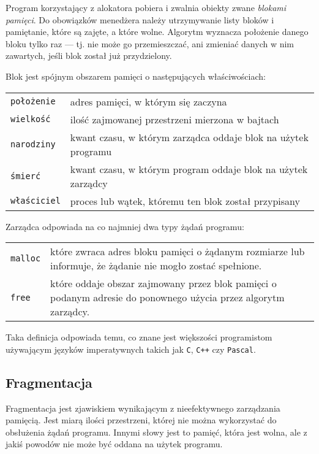 \documentclass[12pt,a4paper,titlepage,twoside]{mwart}
\begin{document}
Program korzystający z alokatora pobiera i zwalnia obiekty zwane
\textit{blokami pamięci}. Do obowiązków menedżera należy utrzymywanie listy
bloków i pamiętanie, które są zajęte, a które wolne. Algorytm wyznacza
położenie danego bloku tylko raz --- tj. nie może go przemieszczać, ani zmieniać
danych w nim zawartych, jeśli blok został już przydzielony.

Blok jest spójnym obszarem pamięci o następujących właściwościach:

\begin{tabularx}{\textwidth}{@{\hspace{4ex}}lX@{}}
	\texttt{położenie}	& adres pamięci, w którym się zaczyna \\
	\texttt{wielkość}	& ilość zajmowanej przestrzeni mierzona w bajtach \\
	\texttt{narodziny}	& kwant czasu, w którym zarządca oddaje blok na użytek programu \\
	\texttt{śmierć}		& kwant czasu, w którym program oddaje blok na użytek zarządcy \\
	\texttt{właściciel}	& proces lub wątek, któremu ten blok został przypisany \\
\end{tabularx}

Zarządca odpowiada na co najmniej dwa typy żądań programu:

\begin{tabularx}{\textwidth}{@{\hspace{4ex}}lX@{}}
	\texttt{malloc} & które zwraca adres bloku pamięci o żądanym
	rozmiarze lub informuje, że żądanie nie mogło zostać spełnione. \\

	\texttt{free} & które oddaje obszar zajmowany przez blok pamięci o
	podanym adresie do ponownego użycia przez algorytm zarządcy. \\
\end{tabularx}

Taka definicja odpowiada temu, co znane jest większości programistom
używającym języków imperatywnych takich jak \verb#C#, \verb#C++# czy
\verb#Pascal#.

\subsection{Fragmentacja}

Fragmentacja jest zjawiskiem wynikającym z nieefektywnego zarządzania pamięcią.
Jest miarą ilości przestrzeni, której nie można wykorzystać do obsłużenia żądań
programu. Innymi słowy jest to pamięć, która jest wolna, ale z jakiś powodów
nie może być oddana na użytek programu.
\end{document}

